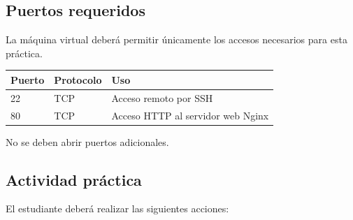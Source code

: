 \documentclass[
  coursetitle={Cómputo Nube y Tecnologías Emergentes},
  coursehours={96},
  coursedate={Verano 2026},
  doctype={Tarea 2},
  otherlangs={english,french},
  authorname={Lázaro},
  authorsurname={Bustio-Martínez},
  authortitle={PhD},
  role={Profesor Investigador},
  email={lbustio@inaoe.mx},
  phone={5559504000},
  ext={7459},
  institution={Instituto Nacional de Astrofísica, Óptica y Electrónica (INAOE)},
  department={Maestría en Ciencias en Tecnologías de Seguridad},
  address={Luis Enrique Erro 1, Sta. Ma. Tonantzintla, San Andrés Cholula, CP 72840, Puebla, México},
  margin={0.5in}
]{lbustio_lecture_notes}
\begin{document}
\subsection{Puertos requeridos}
\label{sec:tarea2-puertos}

La máquina virtual deberá permitir únicamente los accesos necesarios para esta práctica.

\begin{center}
\begin{tabular}{|p{}|p{}|p{}|}
\hline
\textbf{Puerto} & \textbf{Protocolo} & \textbf{Uso} \\
\hline
22 & TCP & Acceso remoto por SSH \\
\hline
80 & TCP & Acceso HTTP al servidor web Nginx \\
\hline
\end{tabular}
\end{center}

No se deben abrir puertos adicionales.

\subsection{Actividad práctica}
\label{sec:tarea2-actividad}

El estudiante deberá realizar las siguientes acciones:
\end{document}
